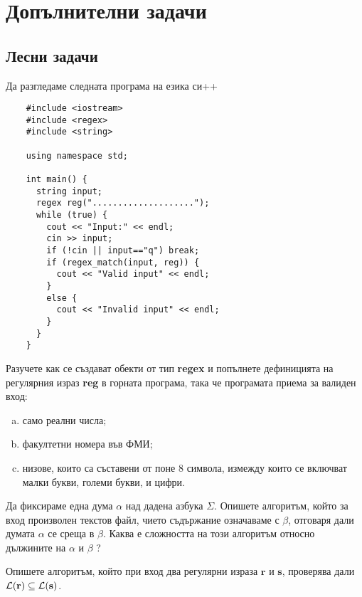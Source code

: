 \section{Допълнителни задачи}

\subsection{Лесни задачи}

\begin{problem}
  Да разгледаме следната програма на езика си++
  \begin{verbatim}
    #include <iostream>
    #include <regex>
    #include <string>
    
    using namespace std;
    
    int main() {
      string input;
      regex reg("....................");
      while (true) {
        cout << "Input:" << endl;
        cin >> input;
        if (!cin || input=="q") break;
        if (regex_match(input, reg)) {
          cout << "Valid input" << endl;
        }  
        else {
          cout << "Invalid input" << endl;
        }
      }
    }
  \end{verbatim}
  Разучете как се създават обекти от тип {\bf regex} и попълнете дефиницията на регулярния израз {\bf reg} в горната програма, така че програмата приема за валиден вход:
  \begin{enumerate}[a)]
  \item 
    само реални числа;
  \item
    факултетни номера във ФМИ;
  \item
    низове, които са съставени от поне 8 символа, измежду които се включват малки букви, големи букви,
    и цифри.    
  \end{enumerate}
\end{problem}

\begin{problem}
  Да фиксираме една дума $\alpha$ над дадена азбука $\Sigma$.
  Опишете алгоритъм, който за вход произволен текстов файл, чието съдържание означаваме с $\beta$,
  отговаря дали думата $\alpha$ се среща в $\beta$.
  Каква е сложността на този алгоритъм относно дължините на $\alpha$ и $\beta$ ?
\end{problem}

\begin{problem}
  Опишете алгоритъм, който при вход два регулярни израза $\mathbf{r}$ и $\mathbf{s}$,
  проверява дали $\mathcal{L}(\mathbf{r}) \subseteq \mathcal{L}(\mathbf{s})$.
\end{problem}


